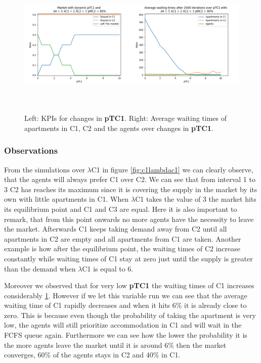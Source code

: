 \begin{figure}
    \centering
    \includegraphics[width=1\linewidth, height = 7cm]{figures/pTC1.png}
    \caption{Left: KPIs for changes in \textbf{pTC1}. Right: Average waiting times of apartments in C1, C2 and the agents over changes in \textbf{pTC1}.}
    \label{fig:pTC1}
\end{figure}

\subsubsection{Observations}

From the simulations over $\lambda$C1 in figure \ref{fig:c1lambdac1} we can clearly observe, that the agents will always prefer C1 over C2. We can see that from interval 1 to 3 C2 has reaches its maximum since it is covering the supply in the market by its own with little apartments in C1. When  $\lambda$C1 takes the value of 3 the market hits its equilibrium point and C1 and C3 are equal. Here it is also important to remark, that from this point onwards no more agents have the necessity to leave the market. Afterwards C1 keeps taking demand away from C2 until all apartments in C2 are empty and all apartments from C1 are taken. Another example is how after the equilibrium point, the waiting times of C2 increase constantly while waiting times of C1 stay at zero just until the supply is greater than the demand when $\lambda$C1 is equal to 6.

Moreover we observed that for very low \textbf{pTC1} the waiting times of C1 increases considerably \ref{fig:pTC1}. However if we let this variable run we can see that the average waiting time of C1 rapidly decreases and when it hits 6\% it is already close to zero. This is because even though the probability of taking the apartment is very low, the agents will still prioritize accommodation in C1 and will wait in the FCFS queue again. Furthermore we can see how the lower the probability it is the more agents leave the market until it is around 6\% then the market converges, 60\% of the agents stays in C2 and 40\% in C1.

